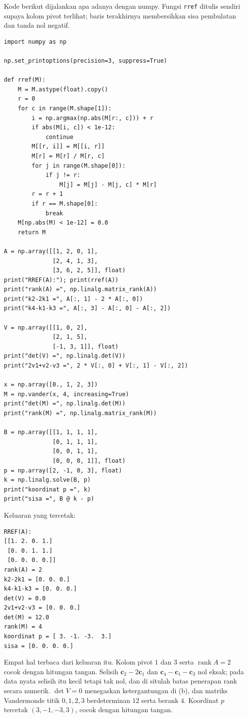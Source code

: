 Kode berikut dijalankan apa adanya dengan numpy. Fungsi \texttt{rref} ditulis sendiri supaya
kolom pivot terlihat; baris terakhirnya membersihkan sisa pembulatan dan tanda nol negatif.

\begin{lab}
\begin{verbatim}
import numpy as np

np.set_printoptions(precision=3, suppress=True)

def rref(M):
    M = M.astype(float).copy()
    r = 0
    for c in range(M.shape[1]):
        i = np.argmax(np.abs(M[r:, c])) + r
        if abs(M[i, c]) < 1e-12:
            continue
        M[[r, i]] = M[[i, r]]
        M[r] = M[r] / M[r, c]
        for j in range(M.shape[0]):
            if j != r:
                M[j] = M[j] - M[j, c] * M[r]
        r = r + 1
        if r == M.shape[0]:
            break
    M[np.abs(M) < 1e-12] = 0.0
    return M

A = np.array([[1, 2, 0, 1],
              [2, 4, 1, 3],
              [3, 6, 2, 5]], float)
print("RREF(A):"); print(rref(A))
print("rank(A) =", np.linalg.matrix_rank(A))
print("k2-2k1 =", A[:, 1] - 2 * A[:, 0])
print("k4-k1-k3 =", A[:, 3] - A[:, 0] - A[:, 2])

V = np.array([[1, 0, 2],
              [2, 1, 5],
              [-1, 3, 1]], float)
print("det(V) =", np.linalg.det(V))
print("2v1+v2-v3 =", 2 * V[:, 0] + V[:, 1] - V[:, 2])

x = np.array([0., 1, 2, 3])
M = np.vander(x, 4, increasing=True)
print("det(M) =", np.linalg.det(M))
print("rank(M) =", np.linalg.matrix_rank(M))

B = np.array([[1, 1, 1, 1],
              [0, 1, 1, 1],
              [0, 0, 1, 1],
              [0, 0, 0, 1]], float)
p = np.array([2, -1, 0, 3], float)
k = np.linalg.solve(B, p)
print("koordinat p =", k)
print("sisa =", B @ k - p)
\end{verbatim}
\end{lab}

Keluaran yang tercetak:
\begin{verbatim}
RREF(A):
[[1. 2. 0. 1.]
 [0. 0. 1. 1.]
 [0. 0. 0. 0.]]
rank(A) = 2
k2-2k1 = [0. 0. 0.]
k4-k1-k3 = [0. 0. 0.]
det(V) = 0.0
2v1+v2-v3 = [0. 0. 0.]
det(M) = 12.0
rank(M) = 4
koordinat p = [ 3. -1. -3.  3.]
sisa = [0. 0. 0. 0.]
\end{verbatim}

Empat hal terbaca dari keluaran itu. Kolom pivot $1$ dan $3$ serta
$\operatorname{rank}A=2$ cocok dengan hitungan tangan. Selisih
$\mathbf{c}_{2}-2\mathbf{c}_{1}$ dan $\mathbf{c}_{4}-\mathbf{c}_{1}-\mathbf{c}_{3}$ nol
eksak; pada data nyata selisih itu kecil tetapi tak nol, dan di situlah batas penerapan rank
secara numerik. $\det V=0$ menegaskan ketergantungan di (b), dan matriks Vandermonde titik $0,1,2,3$
berdeterminan $12$ serta berank $4$. Koordinat $p$ tercetak $(3,-1,-3,3)$, cocok dengan
hitungan tangan.


